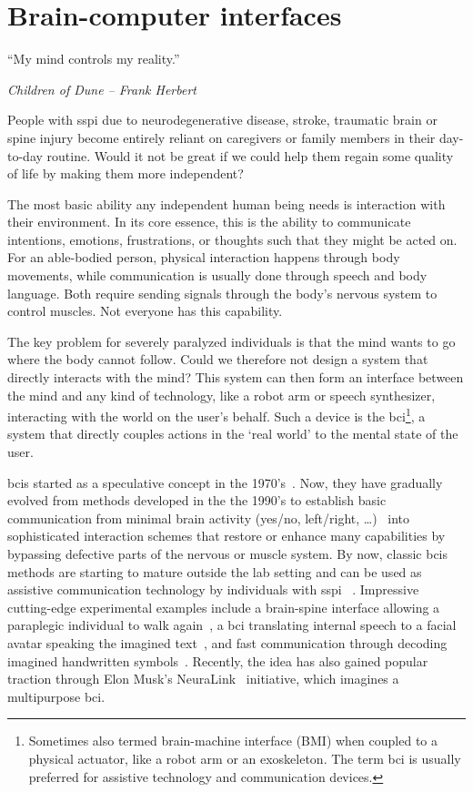 \chapter{Brain-computer interfaces}
\label{sec:bci}
\epigraph{``My mind controls my reality.''}{\emph{Children of Dune -- Frank
Herbert}}

People with \ac{sspi} due to neurodegenerative disease, stroke, traumatic brain or spine
injury become entirely reliant on caregivers or family members in their day-to-day
routine.
Would it not be great if we could help them regain some quality of life by making them
more independent?

The most basic ability any independent human being needs is interaction with their
environment.
In its core essence, this is the ability to communicate intentions, emotions,
frustrations, or thoughts such that they might be acted on.
For an able-bodied person, physical interaction happens through body movements, while
communication is usually done through speech and body language.
Both require sending signals through the body's nervous system to control muscles.
Not everyone has this capability.

The key problem for severely paralyzed individuals is that the mind wants to go where the
body cannot follow.
Could we therefore not design a system that directly interacts with the mind?
This system can then form an interface between the mind and any kind of technology, like
a robot arm or speech synthesizer, interacting with the world on the user's behalf.
Such a device is the \ac{bci}\footnote{Sometimes also termed brain-machine interface
(BMI) when coupled to a physical actuator, like a robot arm or an exoskeleton.
The term \ac{bci} is usually preferred for assistive technology and communication
devices.}, a system that directly couples actions in the `real world' to the mental state
of the user.

\Acp{bci} started as a speculative concept in the 1970's~\cite{Vidal1973}.
Now, they have gradually evolved from methods  developed in the the 1990's to
establish basic communication from minimal brain activity
(yes/no, left/right, \ldots)~\cite{Wolpaw2002} into sophisticated interaction
schemes that restore or enhance many capabilities by bypassing defective parts
of the nervous or muscle system.
By now, classic \acp{bci} methods are starting to mature outside the lab setting and can
be used as assistive communication technology by individuals with \acl{sspi}
~\cite{Wolpaw2018,Milekovic2018}.
Impressive cutting-edge experimental examples include a brain-spine interface allowing a
paraplegic individual to walk again~\cite{Lorach2023}, a \ac{bci} translating internal
speech to a facial avatar speaking the imagined text~\cite{Metzger2023}, and fast
communication through decoding imagined handwritten symbols~\cite{Willett2021}.
Recently, the idea has also gained popular traction through Elon Musk's
NeuraLink~\cite{Musk2019} initiative, which imagines a multipurpose \ac{bci}.

